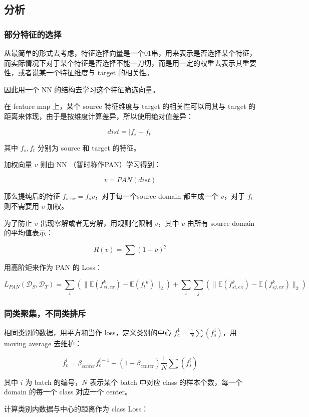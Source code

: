 \documentclass[UTF8]{ctexart}
\begin{document}
\subsection{分析}

\subsubsection{部分特征的选择}

从最简单的形式去考虑，特征选择向量是一个01串，用来表示是否选择某个特征，而实际情况下对于某个特征是否选择不能一刀切，而是用一定的权重去表示其重要性，或者说某一个特征维度与 target 的相关性。

因此用一个 NN 的结构去学习这个特征筛选向量。

在 feature map 上，某个 source 特征维度与 target 的相关性可以用其与 target 的距离来体现，由于是按维度计算差异，所以使用绝对值差异：

$$
dist = |f_s - f_t|
$$

其中 $f_s, f_t$ 分别为 source 和 target 的特征。

加权向量 $v$ 则由 NN （暂时称作PAN）学习得到：

$$
v = PAN(dist)
$$

那么提纯后的特征 $f_{s,ex} = f_s v$，对于每一个source domain 都生成一个 $v$，对于 $f_t$ 则不需要用 $v$ 加权。

为了防止 $v$ 出现零解或者无穷解，用规则化限制 $v$，其中 $v$ 由所有 source domain 的平均值表示：

$$
R(v) = \sum(1 - \bar{v})^2
$$

用高阶矩来作为 PAN 的 Loss：

$$
L_{PAN}(\mathcal{D}_S, \mathcal{D}_T) = \sum_i(\|\mathbb{E}(f_{si,ex}^k) - \mathbb{E}({f_t}^k)\|_2) + \sum_i\sum_j(\|\mathbb{E}(f_{si,ex}^k) - \mathbb{E}(f_{sj,ex}^k)\|_2)
$$

\subsubsection{同类聚集，不同类排斥}

相同类别的数据，用平方和当作 loss，定义类别的中心 $f_c^1 = \frac{1}{N}\sum(f_s^1)$，用 moving average 去维护：

$$
f_c^i = \beta_{center} f_c^{i-1} + (1-\beta_{center}) \frac{1}{N}\sum(f_s^i)
$$

其中 $i$ 为 batch 的编号，$N$ 表示某个 batch 中对应 class 的样本个数，每一个 domain 的每一个 class 对应一个 center。

计算类别内数据与中心的距离作为 class Loss：
\end{document}
